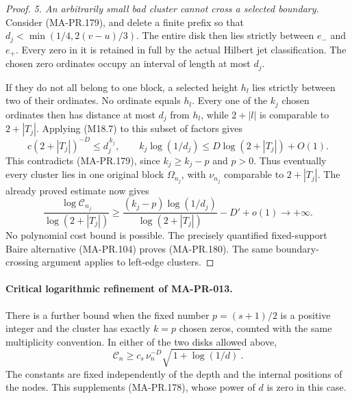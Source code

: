 \begin{proof}
\emph{5. An arbitrarily small bad cluster cannot cross a selected boundary.}
Consider (MA-PR.179), and delete a finite prefix
so that \(d_j<\min(1/4,2(v-u)/3)\).  The entire
disk then lies strictly between \(e_-\) and
\(e_+\).  Every zero in it is retained in full
by the actual Hilbert jet classification.
The chosen zero ordinates occupy an interval
of length at most \(d_j\).

If they do not all belong to one block, a
selected height \(h_l\) lies strictly between
two of their ordinates.  No ordinate equals
\(h_l\).  Every one of the \(k_j\) chosen
ordinates then has distance at most \(d_j\)
from \(h_l\), while \(2+|l|\) is comparable
to \(2+|T_j|\).  Applying (M18.7) to this
subset of factors gives
\[
       c(2+|T_j|)^{-D}
             \le d_j^{\,k_j},
 \qquad
       k_j\log(1/d_j)
             \le D\log(2+|T_j|)+O(1).
 \tag{MA-PR.193}
\]
This contradicts (MA-PR.179), since
\(k_j\ge k_j-p\) and \(p>0\).
Thus eventually every cluster lies in one
original block \(\Omega_{n_j}\), with
\(\nu_{n_j}\) comparable to \(2+|T_j|\).
The already proved estimate now gives
\[
 \frac{\log\mathcal C_{n_j}}
                   {\log(2+|T_j|)}
 \ge
 \frac{(k_j-p)\log(1/d_j)}
                   {\log(2+|T_j|)}
                  -D'+o(1)
       \longrightarrow+\infty .
 \tag{MA-PR.194}
\]
No polynomial cost bound is possible.  The
precisely quantified fixed-support Baire
alternative (MA-PR.104) proves (MA-PR.180).
The same boundary-crossing argument applies
to left-edge clusters.
\end{proof}

\paragraph{Critical logarithmic refinement of MA-PR-013.}
There is a further bound when the fixed number
\(p=(s+1)/2\) is a positive integer and the cluster
has exactly \(k=p\) chosen zeros, counted with the
same multiplicity convention.  In either of the
two disks allowed above,
\[
       \mathcal C_n\ge
          c_s\,\nu_n^{-D}
                    \sqrt{\,1+\log(1/d)\,}.
 \tag{MA-PR.195}
\]
The constants are fixed independently of the
depth and the internal positions of the nodes.
This supplements (MA-PR.178), whose power of
\(d\) is zero in this case.

